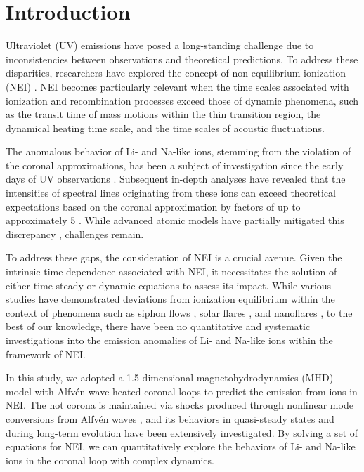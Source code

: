 \documentclass[fleqn,usenatbib]{mnras}
\begin{document}


\section{Introduction}
Ultraviolet (UV) emissions have posed a long-standing challenge due to inconsistencies between observations and theoretical predictions. To address these disparities, researchers have explored the concept of non-equilibrium ionization (NEI) \citep{1964spre.conf..730N,1978ApJ...226..698M,1979ApJ...229L.101D}. NEI becomes particularly relevant when the time scales associated with ionization and recombination processes exceed those of dynamic phenomena, such as the transit time of mass motions within the thin transition region, the dynamical heating time scale, and the time scales of acoustic fluctuations.

The anomalous behavior of Li- and Na-like ions, stemming from the violation of the coronal approximations, has been a subject of investigation since the early days of UV observations \citep{1971RSPTA.270...81B,1972ApJ...178..527D}. Subsequent in-depth analyses have revealed that the intensities of spectral lines originating from these ions can exceed theoretical expectations based on the coronal approximation by factors of up to approximately 5 \citep{1995ApJ...455L..85J}. While advanced atomic models have partially mitigated this discrepancy \citep{2023MNRAS.521.4696D}, challenges remain.

To address these gaps, the consideration of NEI is a crucial avenue. Given the intrinsic time dependence associated with NEI, it necessitates the solution of either time-steady or dynamic equations to assess its impact. While various studies have demonstrated deviations from ionization equilibrium within the context of phenomena such as siphon flows \citep{1989ApJ...338.1131N,1990ApJ...362..370S}, solar flares \citep{1984SoPh...90..357M,2011ApJ...742...70I,2015PhPl...22j1206I}, and nanoflares \citep{1982ApJ...255..783M, 1993ApJ...402..741H, 2009A&A...502..409B}, to the best of our knowledge, there have been no quantitative and systematic investigations into the emission anomalies of Li- and Na-like ions within the framework of NEI.

In this study, we adopted a 1.5-dimensional magnetohydrodynamics (MHD) model with Alfv\'{e}n-wave-heated coronal loops \citep{2004ApJ...601L.107M, 2004ESASP.575...80M} to predict the emission from ions in NEI. The hot corona is maintained via shocks produced through nonlinear mode conversions from Alfv\'{e}n waves \citep{1982SoPh...75...35H, 1999ApJ...514..493K}, and its behaviors in quasi-steady states \citep{2010ApJ...712..494A} and during long-term evolution \citep{2019ApJ...885..164W} have been extensively investigated. By solving a set of equations for NEI, we can quantitatively explore the behaviors of Li- and Na-like ions in the coronal loop with complex dynamics.
\end{document}
